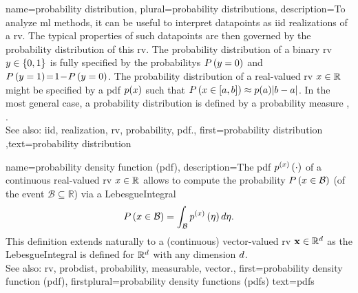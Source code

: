 {name={probability distribution}, plural={probability distributions},
	description={To analyze \gls{ml} methods, it can be useful 
		to interpret \glspl{datapoint} as \gls{iid} \glspl{realization} of a \gls{rv}. The typical 
		properties of such \glspl{datapoint} are then governed by the \gls{probability} distribution 
		of this \gls{rv}. The \gls{probability} distribution of a binary \gls{rv} $y \in \{0,1\}$ 
		is fully specified by the \glspl{probability} $P\left(y = 0\right)$ and 
		$P\left(y=1\right)\!=\!1\!-\!P\left(y=0\right)$. The \gls{probability} 
		distribution of a real-valued \gls{rv} $x \in \mathbb{R}$ might be specified 
		by a \gls{pdf} $p(x)$ such that $P\left( x \in [a,b] \right) \approx  p(a) |b-a|$. 
	    	In the most general case, a \gls{probability} distribution is defined by a \gls{probability} measure 
		\cite{BillingsleyProbMeasure}, \cite{GrayProbBook}.
	    		\\
		See also: \gls{iid}, \gls{realization}, \gls{rv}, \gls{probability}, \gls{pdf}.},
	first={probability distribution}
	,text={probability distribution}
}
    
    
{name={probability density function (pdf)},
	description={The pdf 
	$p^{(x)}\left(\cdot\right)$ of a continuous real-valued \gls{rv} $x \in \mathbb{R}$ 
	allows to compute the \gls{probability} $P\left(x \in \mathcal{B}\right)$ (of 
	the \gls{event} $\mathcal{B} \subseteq \mathbb{R}$)
	via a \gls{LebesgueIntegral} \cite[Ch. 3]{BertsekasProb}
	 $$P\left(x \in \mathcal{B}\right) = \int_{\mathcal{B}} p^{(x)}\left(\eta\right) d 
	 \eta.$$ 
	 This definition extends naturally to a (continuous) vector-valued \gls{rv} 
	 ${\bf x} \in \mathbb{R}^{d}$ as the \gls{LebesgueIntegral} 
	 is defined for $\mathbb{R}^{d}$ with any \gls{dimension} $d$. 
        		\\
		See also: \gls{rv}, \gls{probdist}, \gls{probability}, \gls{measurable}, \gls{vector}.},
	first={probability density function (pdf)},
	firstplural={probability density functions (pdfs)}
	text={pdfs}
}


